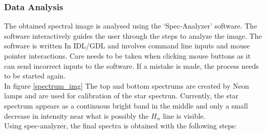 \documentclass[12pt,a4paper]{article}
\begin{document}
    \subsubsection{Data Analysis}
      The obtained spectral image is analysed using the `Spec-Analyzer' software. The software interactively guides the user through the steps to analyze the image. The software is written In
      IDL/GDL and involves command line inputs and mouse pointer interactions. Care needs to be taken when clicking mouse buttons as it can send incorrect inputs to the software. If a mistake is made, the process
      needs to be started again. \\
      In figure \ref{spectrum_img} The top and bottom spectrums are created by Neon lamps and are used for calibration of  the star spectrun. Currently, the star spectrum appears as a
      continuous bright band in the middle and only a small decrease in intensity near what is possibly the $H_\alpha$ line is visible. \\
      Using spec-analyzer, the final spectra is obtained with the following steps:
\end{document}
